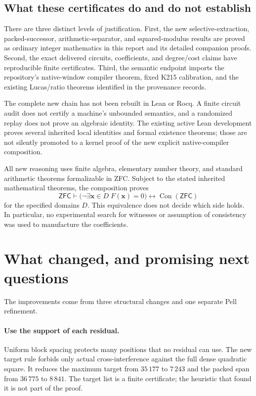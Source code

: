 \documentclass[11pt,letterpaper]{article}
\theoremstyle{remark}\newtheorem{remark}[theorem]{Remark}
\newcommand{\Con}{\operatorname{Con}}\newcommand{\ZFC}{\mathsf{ZFC}}
\begin{document}
\subsection{What these certificates do and do not establish}
There are three distinct levels of justification.
First, the new selective-extraction, packed-successor, arithmetic-separator,
and squared-modulus results are proved as ordinary integer mathematics
in this report and its detailed companion proofs.
Second, the exact delivered circuits, coefficients, and degree/cost claims
have reproducible finite certificates.
Third, the semantic endpoint imports the repository's native-window
compiler theorem, fixed K215 calibration, and the existing Lucas/ratio
theorems identified in the provenance records.

The complete new chain has not been rebuilt in Lean or Rocq.
A finite circuit audit does not certify a machine's unbounded semantics,
and a randomized replay does not prove an algebraic identity.
The existing active Lean development proves several inherited local
identities and formal existence theorems; those are not silently promoted
to a kernel proof of the new explicit native-compiler composition.

All new reasoning uses finite algebra, elementary number theory, and
standard arithmetic theorems formalizable in ZFC. Subject to the stated
inherited mathematical theorems, the composition proves
\[
 \ZFC\vdash
 \bigl(\neg\exists\mathbf x\in D\;F(\mathbf x)=0\bigr)
 \longleftrightarrow\Con(\ZFC)
\]
for the specified domains $D$. This equivalence does not decide which
side holds. In particular, no experimental search for witnesses or
assumption of consistency was used to manufacture the coefficients.

\section{What changed, and promising next questions}
The improvements come from three structural changes and one separate
Pell refinement.

\paragraph{Use the support of each residual.}
Uniform block spacing protects many positions that no residual can use.
The new target rule forbids only actual cross-interference against
the full dense quadratic square. It reduces the maximum target from
$35\,177$ to $7\,243$ and the packed span from $36\,775$ to $8\,841$.
The target list is a finite certificate; the heuristic that found it
is not part of the proof.
\end{document}
